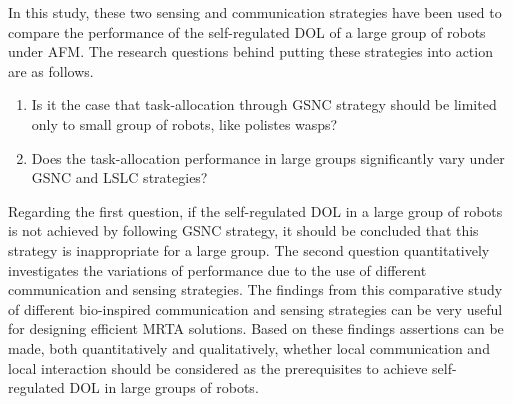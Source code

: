 In this study, these two sensing and communication strategies have been used to compare the performance of the self-regulated DOL of a large group of robots under AFM. %
The research questions behind putting these strategies into action are as follows.
\begin{enumerate}
\item Is it the case that task-allocation through GSNC strategy should be limited only to small group of robots, like polistes wasps?
\item 
Does the task-allocation performance in large groups significantly vary under GSNC and LSLC strategies?
\end{enumerate}
Regarding the first question, if the self-regulated DOL in a large group of robots is not achieved by following GSNC strategy, it should be concluded that this strategy is inappropriate for a large group. The second question quantitatively investigates the variations of performance due to the use of different communication and sensing strategies. The findings from this comparative study of different bio-inspired communication and sensing strategies can be very useful for designing efficient MRTA solutions. Based on these findings assertions can be made, both quantitatively and qualitatively, whether local communication and local interaction should be considered as the prerequisites to achieve self-regulated DOL in large groups of robots.
